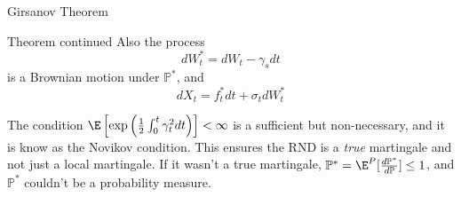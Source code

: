 \documentclass{beamer}
\begin{document}
\begin{frame}{Girsanov Theorem}
	\begin{block}{Theorem continued}
		Also the process
		\begin{equation}
			dW^*_t = dW_t -\gamma_s dt
		\end{equation}
		is a Brownian motion under $\mathbb{P}^*$, and
		\begin{equation*}
			dX_t = f^*_t dt + \sigma_t dW^*_t
		\end{equation*}
	\end{block}
	\vfill
	\begin{tcolorbox}[colback=gray!5, colframe=maincolor, arc=0mm, boxrule=0.5pt]
		\footnotesize
		The condition $\E\left[\exp\left(\frac{1}{2}\int_0^t\gamma_t^2dt\right)\right]<\infty$ is a sufficient but non-necessary, and it is know as the \textcolor{maincolor}{Novikov condition}.
		This ensures the RND is a \emph{true} martingale and not just a local martingale.
		If it wasn't a true martingale, $\mathbb{P}^* =\E^{P}[\frac{d\mathbb{P}^*}{d\mathbb{P}}]\leq 1$, and $\mathbb{P}^*$ couldn't be a probability measure.
	\end{tcolorbox}
\end{frame}
\end{document}
